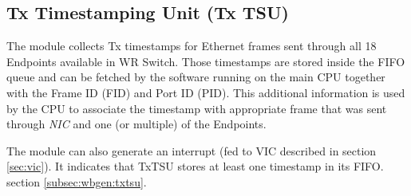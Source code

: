 \subsection{Tx Timestamping Unit (Tx TSU)}


The module collects Tx timestamps for Ethernet frames sent through all 18
Endpoints available in WR Switch. Those timestamps are stored inside the FIFO
queue and can be fetched by the software running on the main CPU together with
the Frame ID (FID) and Port ID (PID). This additional information is used by
the CPU to associate the timestamp with appropriate frame that was sent through
\emph{NIC} and one (or multiple) of the Endpoints.

The module can also generate an interrupt (fed to VIC described in section
\ref{sec:vic}). It indicates that TxTSU stores at least one timestamp in its
FIFO.\\

 section \ref{subsec:wbgen:txtsu}.
